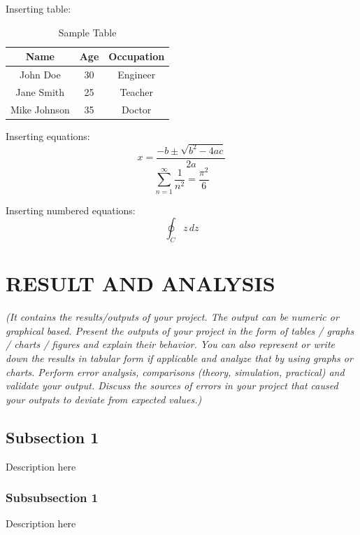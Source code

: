\documentclass{ioereport}
\begin{document}
    Inserting table:\\
    \begin{table}[H]
        \caption{Sample Table}
        \label{tab:sample}
        \centering
        \begin{tabular}{|c|c|c|}
            \hline
            \textbf{Name} & \textbf{Age} & \textbf{Occupation} \\
            \hline
            John Doe & 30 & Engineer \\
            Jane Smith & 25 & Teacher \\
            Mike Johnson & 35 & Doctor \\
            \hline
        \end{tabular}
    \end{table}
    
    Inserting equations:\\
    $$ x = \frac{-b \pm \sqrt{b^2 - 4ac}}{2a} $$
    \[ 
        \sum_{n=1}^{\infty} \frac{1}{n^2} = \frac{\pi^2}{6}
    \]
    
    Inserting numbered equations:\\
    \begin{equation} \label{eqn:integral}
        \oint_C z\,dz
    \end{equation}

    \pagebreak 

\section{\MakeUppercase{Result and Analysis}}
    \textit{(It contains the results/outputs of your project. The output can be numeric or graphical based. Present the outputs of your project in the form of tables / graphs / charts / figures and explain their behavior. You can also represent or write down the results in tabular form if applicable and analyze that by using graphs or charts. Perform error analysis, comparisons (theory, simulation, practical) and validate your output. Discuss the sources of errors in your project that caused your outputs to deviate from expected values.)
    }

    \subsection{Subsection 1}
        Description here
        \subsubsection{Subsubsection 1}
            Description here
\end{document}
